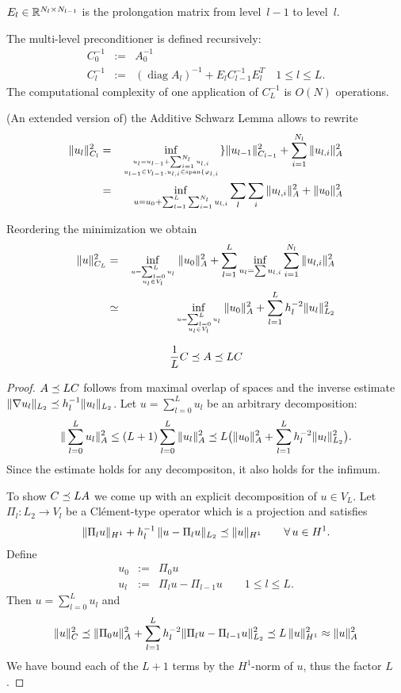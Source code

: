 $E_l \in {\mathbb R}^{N_l \times N_{l-1}}$ is the prolongation matrix from level~$l-1$ to level~$l$.

The multi-level preconditioner is defined recursively:
\begin{eqnarray*}
C_0^{-1} & := & A_0^{-1} \\
C_l^{-1} & := & (\operatorname{diag}A_l)^{-1} + E_l C_{l-1}^{-1} E_l^T \quad 1 \leq l \leq L.
\end{eqnarray*}
The computational complexity of one application of $C_L^{-1}$ is $O(N)$ operations.

(An extended version of) the Additive Schwarz Lemma allows to 
rewrite 
\begin{eqnarray*}
\| u_l \|_{C_l}^2 & = &
\inf_{u_l = u_{l-1} + \sum_{i=1}^{N_l} u_{l,i} \atop
  u_{l-1} \in V_{l-1}, u_{l,i} \in \operatorname{span} \{\varphi_{l,i}} \}
  \| u_{l-1} \|_{C_{l-1}}^2 + \sum_{i=1}^{N_l} \| u_{l,i} \|_A^2 \\ 
 & = & \inf_{u = u_0 + \sum_{l=1}^L \sum_{i=1}^{N_l} u_{l,i}}
 \sum_l \sum_i \| u_{l,i} \|_A^2 + \| u_0 \|_A^2
\end{eqnarray*}

Reordering the minimization we obtain
\begin{eqnarray*}
\| u \|_{C_L}^2 & = & \inf_{u = \sum_{l=0}^L u_l \atop u_l \in V_l}
\| u_0 \|_A^2 + \sum_{l=1}^L \inf_{u_l = \sum u_{l,i}} \sum_{i=1}^{N_l} \| u_{l,i} \|_A^2 \\
& \simeq & \inf_{u = \sum_{l=0}^L u_l \atop u_l \in V_l}
\| u_0 \|_A^2 + \sum_{l=1}^L h_l^{-2} \| u_l \|_{L_2}^2
\end{eqnarray*}

\begin{lemma}  
$$
\frac{1}{L} C \preceq  A \preceq L C
$$
\end{lemma}
\begin{proof} $A \preceq L C$ follows from maximal overlap of spaces and
the inverse estimate $\| \nabla u_l \|_{L_2} \preceq h_l^{-1} \| u_l \|_{L_2}$. Let $u = \sum_{l=0}^L u_l$ be an arbitrary decomposition:
$$
\| \sum_{l=0}^L u_l \|_A^2 \leq (L+1) \sum_{l=0}^L \| u_l \|_A^2 
\preceq L  \big( \| u_0 \|_A^2 + \sum_{l=1}^L h_l^{-2} \| u_l \|_{L_2}^2 \big).
$$
Since the estimate holds for any decompositon, it also holds for the infimum.
\medskip

To show $C \preceq L A$ we come up with an explicit decomposition of $u \in V_L$. Let $\Pi_l : L_2 \rightarrow V_l$ be a Cl\'ement-type operator which is a projection and satisfies
$$
\| \Pi_l u \|_{H^1} + h_l^{-1} \, \| u - \Pi_l u \|_{L_2} \preceq \| u \|_{H^1} \qquad \forall \, u \in H^1.
$$
Define 
\begin{eqnarray*}
u_0 & := & \Pi_0 u \\
u_l & := & \Pi_l u - \Pi_{l-1} u \qquad 1 \leq l \leq L.
\end{eqnarray*}
Then $u = \sum_{l=0}^L u_l$ and
$$
\| u \|_C^2 \preceq \| \Pi_0 u \|_A^2 + \sum_{l=1}^L h_l^{-2} \| \Pi_l u  - \Pi_{l-1} u \|_{L_2}^2 \preceq L  \, \| u \|_{H^1}^2 \approx \| u \|_A^2
$$
We have bound each of the $L+1$ terms by the $H^1$-norm of $u$, thus the factor $L$.
\end{proof}

